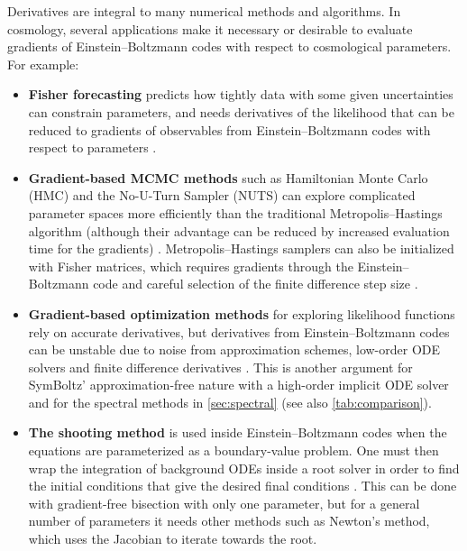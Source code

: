 \documentclass[USenglish, thumbmarks]{uiophdthesis} %
\newcommand\EB{Einstein--Boltzmann}
\begin{document}
Derivatives are integral to many numerical methods and algorithms.
In cosmology, several applications make it necessary or desirable to evaluate gradients of \EB{} codes with respect to cosmological parameters.
For example:
\begin{itemize}
\item
\textbf{Fisher forecasting} predicts how tightly data with some given uncertainties can constrain parameters,
and needs derivatives of the likelihood that can be reduced to gradients of observables from \EB{} codes with respect to parameters
\cite[e.g.][]{eisensteinCosmicComplementarityJoint1999,perottoProbingCosmologicalParameters2006,collaborationEuclidPreparationVII2020a,casasEuclidValidationMontePython2024,hahnDISCODJDifferentiableEinsteinBoltzmann2024a}.

\item
\textbf{Gradient-based MCMC methods} such as Hamiltonian Monte Carlo (HMC) and the No-U-Turn Sampler (NUTS) \cite{hoffmanNoUTurnSamplerAdaptively2011}
can explore complicated parameter spaces more efficiently than the traditional Metropolis--Hastings algorithm
(although their advantage can be reduced by increased evaluation time for the gradients)
\cite[e.g.][]{pirasCosmoPowerJAXHighdimensionalBayesian2023,ruiz-zapateroLimberJackjlAutodifferentiableMethods2024,pirasFutureCosmologicalLikelihoodbased2024a,guntherOLEOnlineLearning2025,nygaardPosteriorSamplingAge2026}.
Metropolis--Hastings samplers can also be initialized with Fisher matrices,
which requires gradients through the \EB{} code and careful selection of the finite difference step size \cite[e.g.][section 3]{brinckmannMontePython3Boosted2019}.

\item
\textbf{Gradient-based optimization methods} for exploring likelihood functions rely on accurate derivatives,
but derivatives from \EB{} codes can be unstable due to noise from approximation schemes, low-order ODE solvers and finite difference derivatives
\cite[e.g.][]{collaborationPlanckIntermediateResults2014a,nygaardCONNECTNeuralNetwork2023,holmPROSPECTProfileLikelihood2024,khalifeReviewHubbleTension2024}.
This is another argument for SymBoltz' approximation-free nature with a high-order implicit ODE solver and for the spectral methods in \cref{sec:spectral} (see also \cref{tab:comparison}).

\item \textbf{The shooting method} is used inside \EB{} codes when the equations are parameterized as a boundary-value problem.
One must then wrap the integration of background ODEs inside a root solver
in order to find the initial conditions that give the desired final conditions
\cite[e.g.][]{audrenStrongestModelindependentBound2014a,sletmoenSymBoltzjlSymbolicnumericApproximationfree2026}.
This can be done with gradient-free bisection with only one parameter,
but for a general number of parameters it needs other methods such as Newton's method,
which uses the Jacobian to iterate towards the root.


\end{itemize}
\end{document}
